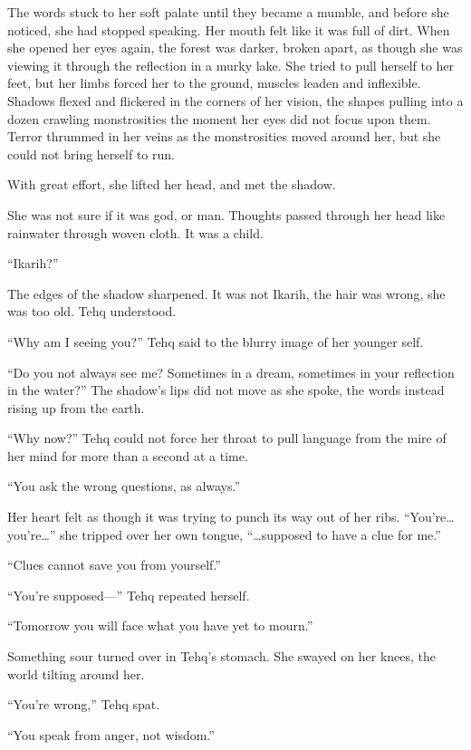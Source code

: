 \vspace{1em}

The words stuck to her soft palate until they became a mumble, and before she noticed, she had stopped speaking. Her mouth felt like it was full of dirt. When she opened her eyes again, the forest was darker, broken apart, as though she was viewing it through the reflection in a murky lake. She tried to pull herself to her feet, but her limbs forced her to the ground, muscles leaden and inflexible. Shadows flexed and flickered in the corners of her vision, the shapes pulling into a dozen crawling monstrosities the moment her eyes did not focus upon them. Terror thrummed in her veins as the monstrosities moved around her, but she could not bring herself to run.

With great effort, she lifted her head, and met the shadow.

She was not sure if it was god, or man. Thoughts passed through her head like rainwater through woven cloth. It was a child.

``Ikarih?''

The edges of the shadow sharpened. It was not Ikarih, the hair was wrong, she was too old. Tehq understood.

``Why am I seeing you?'' Tehq said to the blurry image of her younger self.

``Do you not always see me? Sometimes in a dream, sometimes in your reflection in the water?'' The shadow's lips did not move as she spoke, the words instead rising up from the earth.

``Why now?'' Tehq could not force her throat to pull language from the mire of her mind for more than a second at a time.

``You ask the wrong questions, as always.''

Her heart felt as though it was trying to punch its way out of her ribs. ``You're\ldots{} you're\ldots'' she tripped over her own tongue, ``\ldots{}supposed to have a clue for me.''

``Clues cannot save you from yourself.''

``You're supposed---'' Tehq repeated herself.

``Tomorrow you will face what you have yet to mourn.''

Something sour turned over in Tehq's stomach. She swayed on her knees, the world tilting around her.

``You're wrong,'' Tehq spat.

``You speak from anger, not wisdom.''

